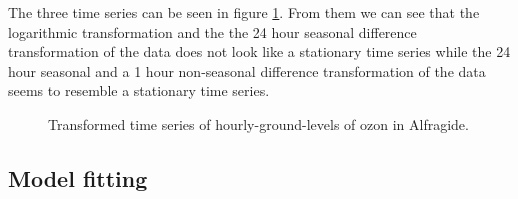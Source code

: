 \documentclass{article}
\begin{document}
The three time series can be seen in figure \ref{fig:ts_trans}. From them we can see that the  logarithmic transformation and the the 24 hour seasonal difference transformation of the data does not look like a stationary time series while the 24 hour seasonal and a 1 hour non-seasonal difference transformation of the data seems to resemble a stationary time series. 

\begin{figure}[ht!]
   \centering
   \caption{Transformed time series of hourly-ground-levels of ozon in Alfragide.}
    \label{fig:ts_trans}
\end{figure}




\subsection{Model fitting}
\label{ch:ea} 
\end{document}
